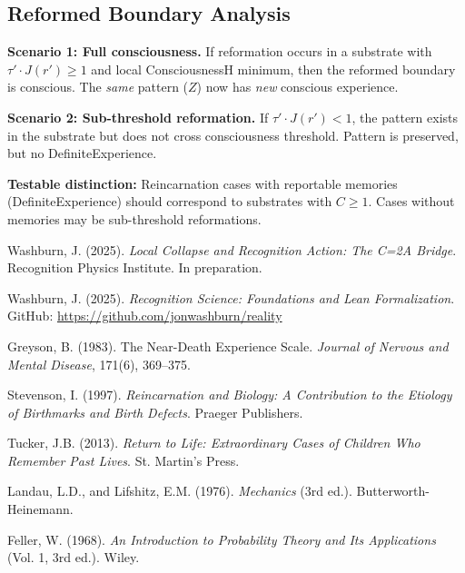 \documentclass[11pt,letterpaper]{article}
\theoremstyle{definition}
\theoremstyle{remark}
\begin{document}
\subsection{Reformed Boundary Analysis}

\textbf{Scenario 1: Full consciousness.} If reformation occurs in a substrate with \(\tau'\cdot J(r')\ge 1\) and local ConsciousnessH minimum, then the reformed boundary is conscious. The \emph{same} pattern (\(Z\)) now has \emph{new} conscious experience.

\textbf{Scenario 2: Sub-threshold reformation.} If \(\tau'\cdot J(r') < 1\), the pattern exists in the substrate but does not cross consciousness threshold. Pattern is preserved, but no DefiniteExperience.

\textbf{Testable distinction:} Reincarnation cases with reportable memories (DefiniteExperience) should correspond to substrates with \(C\ge 1\). Cases without memories may be sub-threshold reformations.

\begin{thebibliography}{9}

Washburn, J. (2025). \emph{Local Collapse and Recognition Action: The C=2A Bridge}. Recognition Physics Institute. In preparation.

Washburn, J. (2025). \emph{Recognition Science: Foundations and Lean Formalization}. GitHub: \url{https://github.com/jonwashburn/reality}

Greyson, B. (1983). The Near-Death Experience Scale. \emph{Journal of Nervous and Mental Disease}, 171(6), 369--375.

Stevenson, I. (1997). \emph{Reincarnation and Biology: A Contribution to the Etiology of Birthmarks and Birth Defects}. Praeger Publishers.

Tucker, J.B. (2013). \emph{Return to Life: Extraordinary Cases of Children Who Remember Past Lives}. St. Martin's Press.

Landau, L.D., and Lifshitz, E.M. (1976). \emph{Mechanics} (3rd ed.). Butterworth-Heinemann.

Feller, W. (1968). \emph{An Introduction to Probability Theory and Its Applications} (Vol. 1, 3rd ed.). Wiley.

\end{thebibliography}
\end{document}

